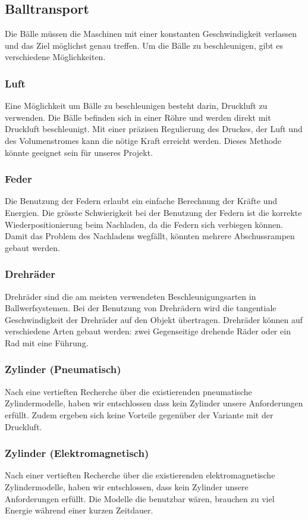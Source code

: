 \subsection{Balltransport}
Die Bälle müssen die Maschinen mit einer konstanten Geschwindigkeit verlassen und das Ziel möglichst genau treffen. Um die Bälle zu beschleunigen, gibt es verschiedene Möglichkeiten.
\subsubsection{Luft}
Eine Möglichkeit um Bälle zu beschleunigen besteht darin, Druckluft zu verwenden. Die Bälle befinden sich in einer Röhre und werden direkt mit Druckluft beschleunigt. Mit einer präzisen Regulierung des Druckes, der Luft und des Volumenstromes kann die nötige Kraft erreicht werden. Dieses Methode könnte geeignet sein für unseres Projekt.
\subsubsection{Feder}
Die Benutzung der Federn erlaubt ein einfache Berechnung der Kräfte und Energien. Die grösste Schwierigkeit bei der Benutzung der Federn ist die korrekte Wiederpositionierung beim Nachladen, da die Federn sich verbiegen können. Damit das Problem des Nachladens wegfällt, könnten mehrere Abschussrampen gebaut werden.
\subsubsection{Drehräder}
Drehräder sind die am meisten verwendeten Beschleunigungsarten in Ballwerfsystemen. Bei der Benutzung von Drehrädern wird die tangentiale Geschwindigkeit der Drehräder auf den Objekt übertragen. Drehräder können auf verschiedene Arten gebaut werden: zwei Gegenseitige drehende Räder oder ein Rad mit eine Führung.
\subsubsection{Zylinder (Pneumatisch)}
Nach eine vertieften Recherche über die existierenden pneumatische Zylindermodelle, haben wir entschlossen dass kein Zylinder unsere Anforderungen erfüllt. Zudem ergeben sich keine Vorteile gegenüber der Variante mit der Druckluft.  
\subsubsection{Zylinder (Elektromagnetisch)}
Nach einer vertieften Recherche über die existierenden elektromagnetische Zylindermodelle, haben wir entschlossen, dass kein Zylinder unsere Anforderungen erfüllt. Die Modelle die benutzbar wären, brauchen zu viel Energie während einer kurzen Zeitdauer.